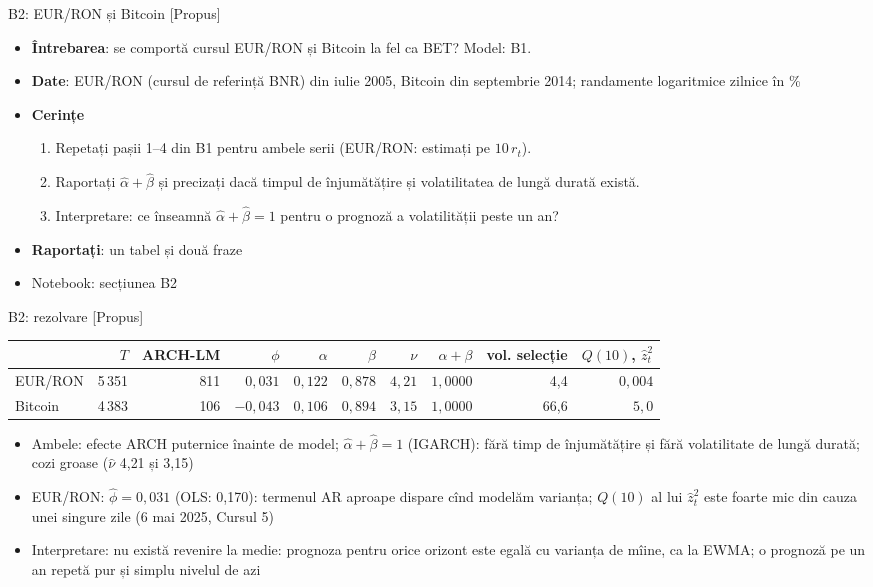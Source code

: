\begin{frame}{B2: EUR/RON și Bitcoin [Propus]}
\itemsize{\footnotesize}
\begin{itemize}
\item \textbf{Întrebarea}: se comportă cursul EUR/RON și Bitcoin la fel ca BET? Model: B1.
\item \textbf{Date}: EUR/RON (cursul de referință BNR) din iulie 2005, Bitcoin din septembrie 2014; randamente logaritmice zilnice în \%
\item \textbf{Cerințe}
\begin{enumerate}
    \item Repetați pașii 1--4 din B1 pentru ambele serii (EUR/RON: estimați pe $10\,r_t$).
    \item Raportați $\hat\alpha + \hat\beta$ și precizați dacă timpul de înjumătățire și volatilitatea de lungă durată există.
    \item Interpretare: ce înseamnă $\hat\alpha + \hat\beta = 1$ pentru o prognoză a volatilității peste un an?
\end{enumerate}
\item \textbf{Raportați}: un tabel și două fraze
\item Notebook: secțiunea B2
\end{itemize}
\end{frame}

\ifsolutions
\begin{frame}{B2: rezolvare [Propus]}
\itemsize{\footnotesize}
\begin{center}
\scriptsize
\begin{tabular}{lrrrrrrrrr}
\toprule
& $T$ & ARCH-LM & $\phi$ & $\alpha$ & $\beta$ & $\nu$ & $\alpha + \beta$ & vol. selecție & $Q(10)$, $\hat z_t^2$ \\
\midrule
EUR/RON & 5\,351 & 811 & $0{,}031$ & $0{,}122$ & $0{,}878$ & $4{,}21$ & $1{,}0000$ & 4{,}4 & $0{,}004$ \\
Bitcoin & 4\,383 & 106 & $-0{,}043$ & $0{,}106$ & $0{,}894$ & $3{,}15$ & $1{,}0000$ & 66{,}6 & $5{,}0$ \\
\bottomrule
\end{tabular}
\end{center}
\begin{itemize}
    \item Ambele: efecte ARCH puternice înainte de model; $\hat\alpha + \hat\beta = 1$ (IGARCH): fără timp de înjumătățire și fără volatilitate de lungă durată; cozi groase ($\hat\nu$ 4{,}21 și 3{,}15)
    \item EUR/RON: $\hat\phi = 0{,}031$ (OLS: 0{,}170): termenul AR aproape dispare cînd modelăm varianța; $Q(10)$ al lui $\hat z_t^2$ este foarte mic din cauza unei singure zile (6 mai 2025, Cursul 5)
    \item Interpretare: nu există revenire la medie: prognoza pentru orice orizont este egală cu varianța de mîine, ca la EWMA; o prognoză pe un an repetă pur și simplu nivelul de azi
\end{itemize}
\end{frame}
\fi

